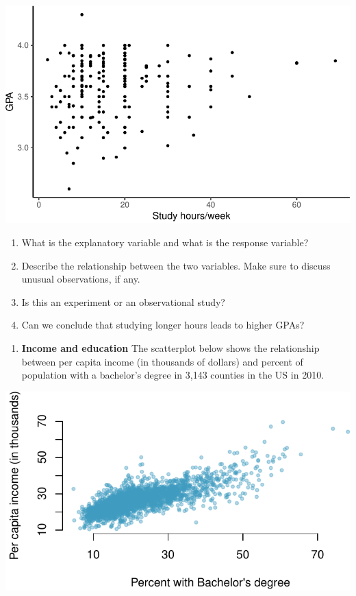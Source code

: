 \documentclass[
  letterpaper,
  DIV=11,
  numbers=noendperiod]{scrreprt}
\providecommand{\tightlist}{%
  \setlength{\itemsep}{0pt}\setlength{\parskip}{0pt}}\usepackage{longtable,booktabs,array}
\begin{document}
\includegraphics{03-Overview-of-Data-Collection-Principles_files/figure-pdf/unnamed-chunk-6-1.pdf}

\begin{enumerate}
\def\labelenumi{\alph{enumi}.}
\item
  What is the explanatory variable and what is the response variable?
\item
  Describe the relationship between the two variables. Make sure to
  discuss unusual observations, if any.
\item
  Is this an experiment or an observational study?
\item
  Can we conclude that studying longer hours leads to higher GPAs?
\end{enumerate}

\begin{enumerate}
\def\labelenumi{\arabic{enumi}.}
\setcounter{enumi}{2}
\tightlist
\item
  \textbf{Income and education} The scatterplot below shows the
  relationship between per capita income (in thousands of dollars) and
  percent of population with a bachelor's degree in 3,143 counties in
  the US in 2010.
\end{enumerate}

\includegraphics{03-Overview-of-Data-Collection-Principles_files/figure-pdf/unnamed-chunk-7-1.pdf}
\end{document}
